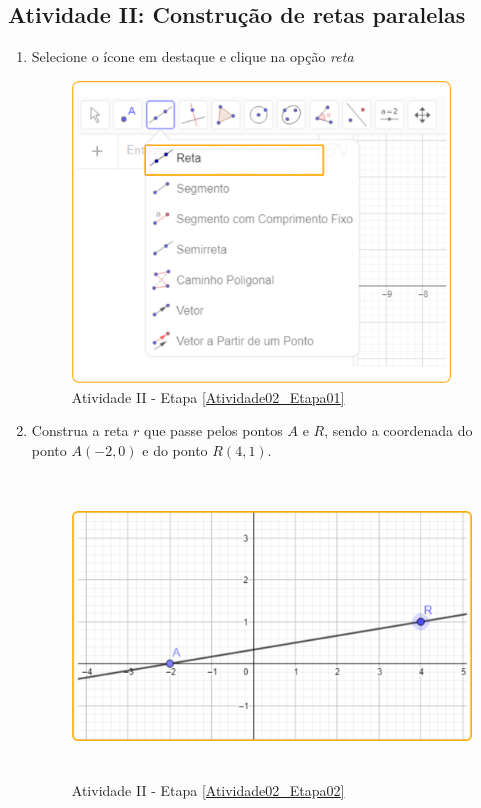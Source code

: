 \documentclass[11pt,a4paper]{article}
\begin{document}
\newpage

\subsection{Atividade II: Construção de retas paralelas}

\begin{enumerate}[{Etapa} 1.] 
\item Selecione o ícone em destaque e clique na opção {\it reta} \label{Atividade02_Etapa01}
\begin{figure}[H]
    \centering
    \includegraphics[height=8cm]{Figuras/T01_Elemento02.png}
    \caption{Atividade II - Etapa \ref{Atividade02_Etapa01}}
    \label{Atividade02_Etapa01_Imagem}
\end{figure}

\item Construa a reta $r$ que passe pelos pontos $A$ e $R$, sendo a coordenada do ponto $A (-2,0)$ e do ponto $R (4,1)$.\label{Atividade02_Etapa02}
\begin{figure}[H]
    \centering
    \includegraphics[height=8cm]{Figuras/T01_Atividade02_Fig01.png}
    \caption{Atividade II - Etapa \ref{Atividade02_Etapa02}}
    \label{Atividade02_Etapa02_Imagem}
\end{figure}


\end{enumerate}
\end{document}
